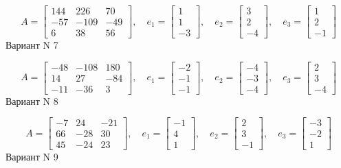 \documentclass[11pt]{report}
\begin{document}
$$A = \left[\begin{matrix}144 & 226 & 70\\-57 & -109 & -49\\6 & 38 & 56\end{matrix}\right],\quad e_1 = \left[\begin{matrix}1\\1\\-3\end{matrix}\right],\quad e_2 = \left[\begin{matrix}3\\2\\-4\end{matrix}\right],\quad e_3 = \left[\begin{matrix}1\\2\\-1\end{matrix}\right]$$Вариант N 7

$$A = \left[\begin{matrix}-48 & -108 & 180\\14 & 27 & -84\\-11 & -36 & 3\end{matrix}\right],\quad e_1 = \left[\begin{matrix}-2\\-1\\-1\end{matrix}\right],\quad e_2 = \left[\begin{matrix}-4\\-3\\-4\end{matrix}\right],\quad e_3 = \left[\begin{matrix}2\\3\\-4\end{matrix}\right]$$Вариант N 8

$$A = \left[\begin{matrix}-7 & 24 & -21\\66 & -28 & 30\\45 & -24 & 23\end{matrix}\right],\quad e_1 = \left[\begin{matrix}-1\\4\\1\end{matrix}\right],\quad e_2 = \left[\begin{matrix}2\\3\\-1\end{matrix}\right],\quad e_3 = \left[\begin{matrix}-3\\-2\\1\end{matrix}\right]$$Вариант N 9
\end{document}
